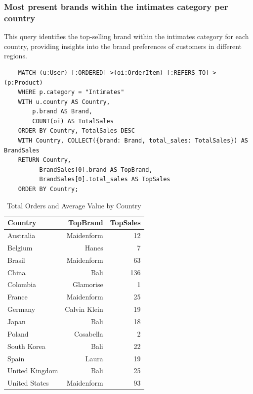 \documentclass[a4paper,12pt]{article}
\begin{document}
  \subsubsection{Most present brands within the intimates category per country}
  This query identifies the top-selling brand within the intimates category for each country, providing insights into the brand preferences of customers in different regions.
  \begin{verbatim}
    MATCH (u:User)-[:ORDERED]->(oi:OrderItem)-[:REFERS_TO]->(p:Product)
    WHERE p.category = "Intimates"
    WITH u.country AS Country, 
        p.brand AS Brand, 
        COUNT(oi) AS TotalSales
    ORDER BY Country, TotalSales DESC
    WITH Country, COLLECT({brand: Brand, total_sales: TotalSales}) AS BrandSales
    RETURN Country, 
          BrandSales[0].brand AS TopBrand, 
          BrandSales[0].total_sales AS TopSales
    ORDER BY Country;
    \end{verbatim}
    \begin{table}[h!]
      \centering
      \caption{Total Orders and Average Value by Country}
      \label{tab:orders_and_average}
      \begin{tabular}{l r r}
          \toprule
          \textbf{Country} & \textbf{TopBrand} & \textbf{TopSales} \\
          \midrule
            \midrule
            Australia       & Maidenform    & 12 \\
            Belgium         & Hanes         & 7 \\
            Brasil          & Maidenform    & 63 \\
            China           & Bali          & 136 \\
            Colombia        & Glamorise     & 1 \\
            France          & Maidenform    & 25 \\
            Germany         & Calvin Klein  & 19 \\
            Japan           & Bali          & 18 \\
            Poland          & Cosabella     & 2 \\
            South Korea     & Bali          & 22 \\
            Spain           & Laura         & 19 \\
            United Kingdom  & Bali          & 25 \\
            United States   & Maidenform    & 93 \\
          \bottomrule
      \end{tabular}
  \end{table}
\end{document}
